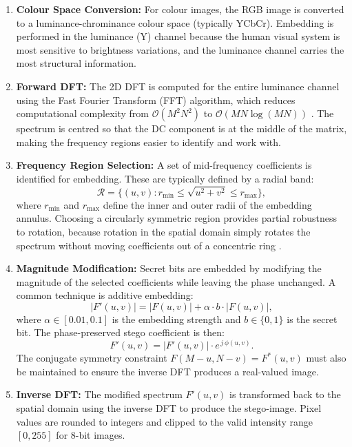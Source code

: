 \documentclass[12pt,a4paper,oneside]{report}
\begin{document}
	\begin{enumerate}
		\item \textbf{Colour Space Conversion:}
		For colour images, the RGB image is converted to a luminance-chrominance colour space
		(typically YCbCr). Embedding is performed in the luminance (Y) channel because the human
		visual system is most sensitive to brightness variations, and the luminance channel carries
		the most structural information.
		
		\item \textbf{Forward DFT:}
		The 2D DFT is computed for the entire luminance channel using the Fast Fourier Transform
		(FFT) algorithm, which reduces computational complexity from $\mathcal{O}(M^2N^2)$ to
		$\mathcal{O}(MN\log(MN))$ \cite{cooley1965algorithm}. The spectrum is centred so that the
		DC component is at the middle of the matrix, making the frequency regions easier to identify
		and work with.
		
		\item \textbf{Frequency Region Selection:}
		A set of mid-frequency coefficients is identified for embedding. These are typically
		defined by a radial band:
		\begin{equation}
			\mathcal{R} = \{(u,v) : r_{\min} \leq \sqrt{u^2+v^2} \leq r_{\max}\},
			\label{eq:dft_region}
		\end{equation}
		where $r_{\min}$ and $r_{\max}$ define the inner and outer radii of the embedding annulus.
		Choosing a circularly symmetric region provides partial robustness to rotation, because
		rotation in the spatial domain simply rotates the spectrum without moving coefficients
		out of a concentric ring \cite{solachidis2001circularly}.
		
		\item \textbf{Magnitude Modification:}
		Secret bits are embedded by modifying the magnitude of the selected coefficients while
		leaving the phase unchanged. A common technique is additive embedding:
		\begin{equation}
			|F'(u,v)| = |F(u,v)| + \alpha \cdot b \cdot |F(u,v)|,
			\label{eq:dft_embed}
		\end{equation}
		where $\alpha \in [0.01, 0.1]$ is the embedding strength and $b \in \{0,1\}$ is the
		secret bit. The phase-preserved stego coefficient is then:
		\begin{equation}
			F'(u,v) = |F'(u,v)| \cdot e^{\,j\,\phi(u,v)}.
			\label{eq:dft_stego_coeff}
		\end{equation}
		The conjugate symmetry constraint $F(M-u, N-v) = F^*(u,v)$ must also be maintained to
		ensure the inverse DFT produces a real-valued image.
		
		\item \textbf{Inverse DFT:}
		The modified spectrum $F'(u,v)$ is transformed back to the spatial domain using the
		inverse DFT to produce the stego-image. Pixel values are rounded to integers and clipped
		to the valid intensity range $[0, 255]$ for 8-bit images.
	\end{enumerate}
	
\end{document}
